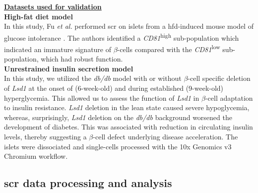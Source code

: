 \underline{\normalsize \textbf{Datasets used for validation}}\\
\label{subsubsec:met_chp3_data}
\textbf{High-fat diet model\\}
In this study, Fu \textit{et al.} performed \gls{scr} on islets from a \gls{hfd}-induced mouse model of glucose intolerance \textbf{\cite{fu_single-cell_2023}}. The authors identified a \textit{CD81}\textsuperscript{high} sub-population which indicated an immature signature of $\beta$-cells compared with the \textit{CD81}\textsuperscript{low} sub-population, which had robust function.\\

\textbf{Unrestrained insulin secretion model\\}
In this study, we utilized the \textit{db/db} model with or without $\beta$-cell specific deletion of \textit{Lsd1} at the onset of (6-week-old) and during established (9-week-old) hyperglycemia. This allowed us to assess the function of \textit{Lsd1} in $\beta$-cell adaptation to insulin resistance. \textit{Lsd1} deletion in the lean state caused severe hypoglycemia, whereas, surprisingly, \textit{Lsd1} deletion on the \textit{db/db} background worsened the development of diabetes. This was associated with reduction in circulating insulin levels, thereby suggesting a $\beta$-cell defect underlying disease acceleration. The islets were dissociated and single-cells processed with the 10x Genomics v3 Chromium workflow.\\ 


\subsection[\glsentryshort{scr} data processing and analysis]{\gls{scr} data processing and analysis}

